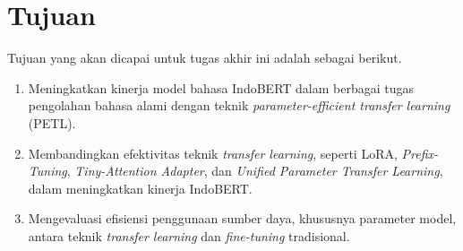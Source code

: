 \section{Tujuan}

Tujuan yang akan dicapai untuk tugas akhir ini adalah sebagai berikut.

\begin{enumerate}
    \item Meningkatkan kinerja model bahasa IndoBERT dalam berbagai tugas pengolahan bahasa alami dengan teknik \textit{parameter-efficient transfer learning} (PETL).
    \item Membandingkan efektivitas teknik \textit{transfer learning}, seperti LoRA, \textit{Prefix-Tuning}, \textit{Tiny-Attention Adapter}, dan \textit{Unified Parameter Transfer Learning}, dalam meningkatkan kinerja IndoBERT.
    \item Mengevaluasi efisiensi penggunaan sumber daya, khususnya parameter model, antara teknik \textit{transfer learning} dan \textit{fine-tuning} tradisional.
\end{enumerate}